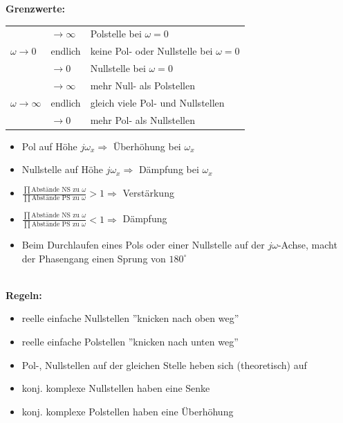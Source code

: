 \begin{minipage}{9cm}
\textbf{Grenzwerte:} \\

\begin{tabular}{|l|l|l|} \hline
\multirow{3}{*}{$\omega \rightarrow 0$} 
	& $\rightarrow \infty$ & Polstelle bei $\omega = 0$ \\
	& endlich & keine Pol- oder Nullstelle bei $\omega = 0$ \\ 
	& $\rightarrow 0$ & Nullstelle bei $\omega = 0$ \\ \hline
\multirow{3}{*}{$\omega \rightarrow \infty$} 
	& $\rightarrow \infty$ & mehr Null- als Polstellen \\
	& endlich & gleich viele Pol- und Nullstellen \\
	& $\rightarrow 0$ & mehr Pol- als Nullstellen \\ \hline
\end{tabular}
\end{minipage}
\begin{minipage}{9.5cm}
\begin{itemize}
  \item Pol auf Höhe $j\omega_x \Longrightarrow$ Überhöhung bei $\omega_x$
  \item Nullstelle auf Höhe $j\omega_x \Longrightarrow$ Dämpfung bei $\omega_x$
  \item $\frac{\prod{\text{Abstände NS zu 
        $\omega$}}}{\prod{\text{Abstände PS zu 
        $\omega$}}} > 1 \Longrightarrow$ Verstärkung
  \item $\frac{\prod{\text{Abstände NS zu 
        $\omega$}}}{\prod{\text{Abstände PS zu 
        $\omega$}}} < 1 \Longrightarrow$ Dämpfung
  \item Beim Durchlaufen eines Pols oder einer Nullstelle auf der $j\omega$-Achse, macht der Phasengang einen Sprung von $180^{\circ}$
\end{itemize}
\end{minipage}\\

\textbf{Regeln:}
\begin{itemize}
	\setlength{\itemsep}{-0.5em}
	\item reelle einfache Nullstellen ''knicken nach oben weg''
	\item reelle einfache Polstellen ''knicken nach unten weg''
	\item Pol-, Nullstellen auf der gleichen Stelle heben sich (theoretisch) auf
	\item konj. komplexe Nullstellen haben eine Senke
	\item konj. komplexe Polstellen haben eine Überhöhung
\end{itemize}

